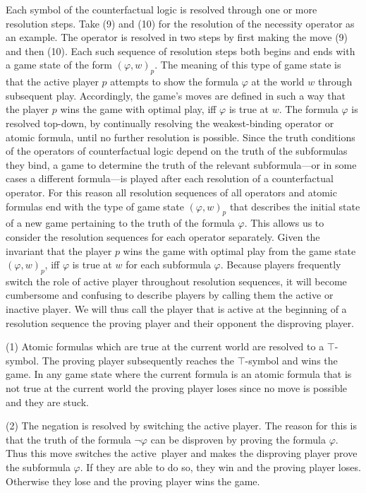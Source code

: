 \documentclass[a4paper,american,10pt]{paper}
\theoremstyle{definition}\newtheorem{lemma}[thm]{Lemma}
\theoremstyle{definition}\newtheorem{proposition}[thm]{Proposition}
\theoremstyle{definition}\newtheorem{corollary}[thm]{Corollary}
\theoremstyle{definition}\newtheorem{definition}{Definition}
\begin{document}
\noindent Each symbol of the counterfactual logic is resolved through one or more resolution steps. Take (9) and (10) for the resolution of the necessity operator as an example. The operator is resolved in two steps by first making the move (9) and then (10). Each such sequence of resolution steps both begins and ends with a game state of the form $(\varphi ,w)_p$. The meaning of this type of game state is that the active player $p$ attempts to show the formula $\varphi$ at the world $w$ through subsequent play. Accordingly, the game's moves are defined in such a way that the player $p$ wins the game with optimal play, iff $\varphi$ is true at $w$. The formula $\varphi$ is resolved top-down, by continually resolving the weakest-binding operator or atomic formula, until no further resolution is possible. Since the truth conditions of the operators of counterfactual logic depend on the truth of the subformulas they bind, a game to determine the truth of the relevant subformula---or in some cases a different formula---is played after each resolution of a counterfactual operator. For this reason all resolution sequences of all operators and atomic formulas end with the type of game state $(\varphi ,w)_p$ that describes the initial state of a new game pertaining to the truth of the formula $\varphi$. This allows us to consider the resolution sequences for each operator separately. Given the invariant that the player $p$ wins the game with optimal play from the game state $(\varphi ,w)_p$, iff $\varphi$ is true at $w$ for each subformula $\varphi$. Because players frequently switch the role of active player throughout resolution sequences, it will become cumbersome and confusing to describe players by calling them the active or inactive player. We will thus call the player that is active at the beginning of a resolution sequence the proving player and their opponent the disproving player.

(1) Atomic formulas which are true at the current world are resolved to a $\top$-symbol. The proving player subsequently reaches the $\top$-symbol and wins the game. In any game state where the current formula is an atomic formula that is not true at the current world the proving player loses since no move is possible and they are stuck.

(2) The negation is resolved by switching the active player. The reason for this is that the truth of the formula $\neg\varphi$ can be disproven by proving the formula $\varphi$. Thus this move switches the active~player and makes the disproving player prove the subformula $\varphi$. If they are able to do so, they win and the proving player loses. Otherwise they lose and the proving player wins the game.
\end{document}
